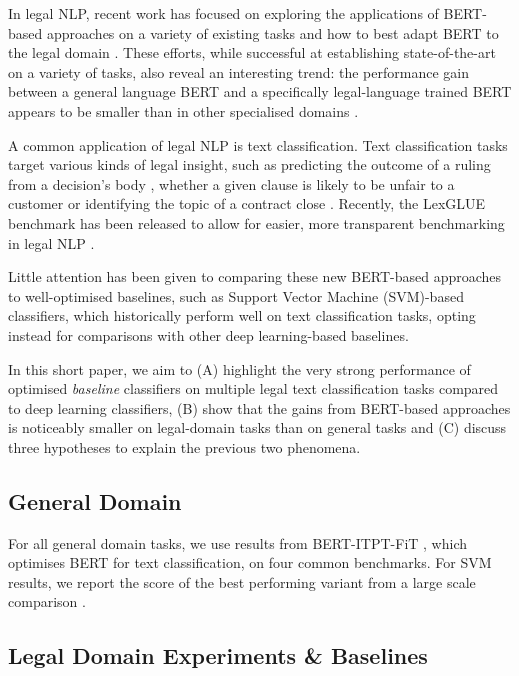 \documentclass{IOS-Book-Article}
\begin{document}
In legal NLP, recent work has focused on exploring the applications of BERT-based approaches on a variety of existing tasks and how to best adapt BERT to the legal domain \cite{legalbertacl, legalberticail}. These efforts, while successful at establishing state-of-the-art on a variety of tasks, also reveal an interesting trend: the performance gain between a general language BERT and a specifically legal-language trained BERT appears to be smaller than in other specialised domains \cite{legalberticail}.

A common application of legal NLP is text classification. Text classification tasks target various kinds of legal insight, such as predicting the outcome of a ruling from a decision's body \cite{echr}, whether a given clause is likely to be unfair to a customer \cite{claudette} or identifying the topic of a contract close \cite{ledgar}. Recently, the LexGLUE benchmark has been released to allow for easier, more transparent benchmarking in legal NLP \cite{lexglue}.

Little attention has been given to comparing these new BERT-based approaches to well-optimised baselines, such as Support Vector Machine (SVM)-based classifiers, which historically perform well on text classification tasks, opting instead for comparisons with other deep learning-based baselines.

In this short paper, we aim to (A) highlight the very strong performance of optimised \textit{baseline} classifiers on multiple legal text classification tasks compared to deep learning classifiers, (B) show that the gains from BERT-based approaches is noticeably smaller on legal-domain tasks than on general tasks and (C) discuss three hypotheses to explain the previous two phenomena.




\subsection{General Domain}


For all general domain tasks, we use results from BERT-ITPT-FiT \cite{bertclf}, which optimises BERT for text classification, on four common benchmarks. For SVM results, we report the score of the best performing variant from a large scale comparison \cite{baselines}.

\subsection{Legal Domain Experiments \& Baselines}
\end{document}
